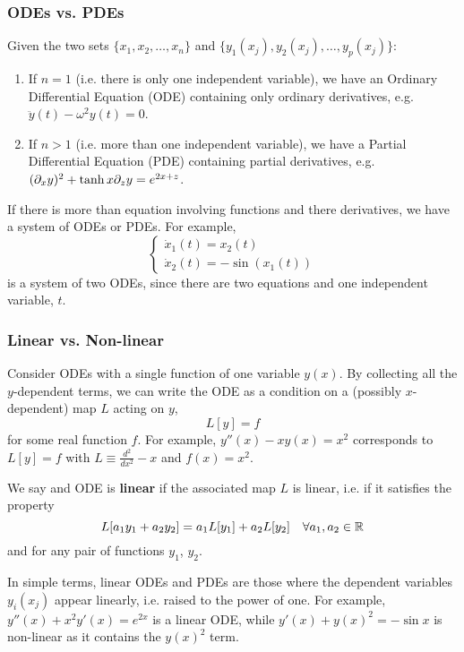 \subsubsection{ODEs vs. PDEs}

\begin{definition}
	Given the two sets $\{x_1, x_2, \ldots, x_n\}$ and $\{y_1(x_j), y_2(x_j), \ldots, y_p(x_j)\}$:
	\begin{enumerate}
		\item If $n=1$ (i.e. there is only one independent variable), we have an Ordinary Differential Equation (ODE) containing only ordinary derivatives, e.g. $\ddot{y}(t) - \omega^2 y(t) = 0$. 
		\item If $n>1$ (i.e. more than one independent variable), we have a Partial Differential Equation (PDE) containing partial derivatives, e.g. $(\partial_x y)^2 + \tanh{x}\partial_z y = e^{2x+z}$.
	\end{enumerate}
	If there is more than equation involving functions and there derivatives, we have a system of ODEs or PDEs. For example,
	\[
		\begin{cases} \dot{x}_1(t) = x_2(t) \\ \dot{x}_2(t) = -\sin(x_1(t)) \end{cases}
	\]
	is a system of two ODEs, since there are two equations and one independent variable, $t$.
\end{definition}

\subsubsection{Linear vs. Non-linear}
	
Consider ODEs with a single function of one variable $y(x)$. By collecting all the $y$-dependent terms, we can write the ODE as a condition on a (possibly $x$-dependent) map $L$ acting on $y$,
\[
	L[y] = f
\]
for some real function $f$. For example, $y''(x) - xy(x) = x^2$ corresponds to $L[y] = f$ with $L \equiv \frac{d^2}{dx^2} - x$ and $f(x) = x^2$.

\begin{definition}
	We say and ODE is \textbf{linear} if the associated map $L$ is linear, i.e. if it satisfies the property
	\[
		L[a_1 y_1 + a_2 y_2] = a_1 L[y_1] + a_2 L[y_2] \quad \forall a_1,a_2 \in \mathbb{R}
	\]
	and for any pair of functions $y_1$, $y_2$.
\end{definition}

In simple terms, linear ODEs and PDEs are those where the dependent variables $y_i(x_j)$ appear linearly, i.e. raised to the power of one. For example, $y''(x) + x^2 y'(x) = e^{2x}$ is a linear ODE, while $y'(x) + y(x)^2 = -\sin{x}$ is non-linear as it contains the $y(x)^2$ term.

